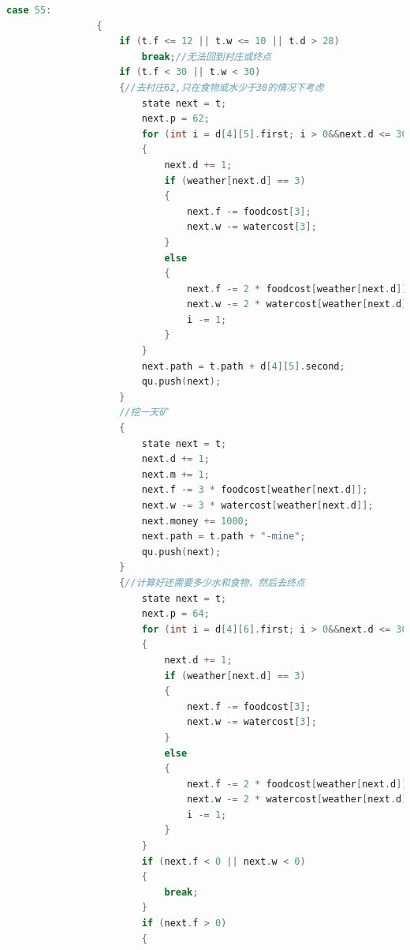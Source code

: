 \documentclass[withoutpreface,bwprint]{cumcmthesis} %
\begin{document}
\begin{appendices}
\begin{lstlisting}[language=c++]
                case 55:
                {
                    if (t.f <= 12 || t.w <= 10 || t.d > 28)
                        break;//无法回到村庄或终点
                    if (t.f < 30 || t.w < 30)
                    {//去村庄62,只在食物或水少于30的情况下考虑
                        state next = t;
                        next.p = 62;
                        for (int i = d[4][5].first; i > 0&&next.d <= 30;)
                        {
                            next.d += 1;
                            if (weather[next.d] == 3)
                            {
                                next.f -= foodcost[3];
                                next.w -= watercost[3];
                            }
                            else
                            {
                                next.f -= 2 * foodcost[weather[next.d]];
                                next.w -= 2 * watercost[weather[next.d]];
                                i -= 1;
                            }
                        }
                        next.path = t.path + d[4][5].second;
                        qu.push(next);
                    }
                    //挖一天矿
                    {
                        state next = t;
                        next.d += 1;
                        next.m += 1;
                        next.f -= 3 * foodcost[weather[next.d]];
                        next.w -= 3 * watercost[weather[next.d]];
                        next.money += 1000;
                        next.path = t.path + "-mine";
                        qu.push(next);
                    }
                    {//计算好还需要多少水和食物，然后去终点
                        state next = t;
                        next.p = 64;
                        for (int i = d[4][6].first; i > 0&&next.d <= 30;)
                        {
                            next.d += 1;
                            if (weather[next.d] == 3)
                            {
                                next.f -= foodcost[3];
                                next.w -= watercost[3];
                            }
                            else
                            {
                                next.f -= 2 * foodcost[weather[next.d]];
                                next.w -= 2 * watercost[weather[next.d]];
                                i -= 1;
                            }
                        }
                        if (next.f < 0 || next.w < 0)
                        {
                            break;
                        }
                        if (next.f > 0)
                        {

\end{lstlisting}
\end{appendices}
\end{document}
